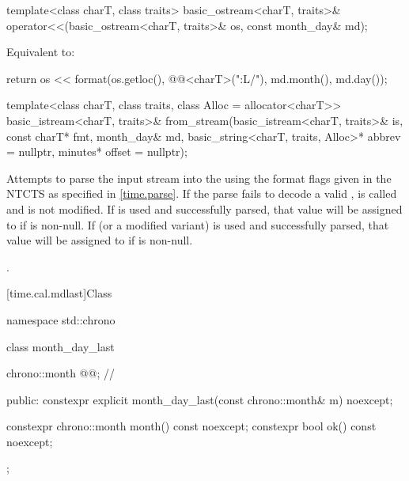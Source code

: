 %
\begin{itemdecl}
template<class charT, class traits>
  basic_ostream<charT, traits>&
    operator<<(basic_ostream<charT, traits>& os, const month_day& md);
\end{itemdecl}

\begin{itemdescr}
\pnum
\effects
Equivalent to:
\begin{codeblock}
return os << format(os.getloc(), @@<charT>("{:L}/{}"),
                    md.month(), md.day());
\end{codeblock}
\end{itemdescr}

%
\begin{itemdecl}
template<class charT, class traits, class Alloc = allocator<charT>>
  basic_istream<charT, traits>&
    from_stream(basic_istream<charT, traits>& is, const charT* fmt,
                month_day& md, basic_string<charT, traits, Alloc>* abbrev = nullptr,
                minutes* offset = nullptr);
\end{itemdecl}

\begin{itemdescr}
\pnum
\effects
Attempts to parse the input stream 
into the   using
the format flags given in the NTCTS 
as specified in \ref{time.parse}.
If the parse fails to decode a valid ,
 is called and
 is not modified.
If  is used and successfully parsed,
that value will be assigned to  if  is non-null.
If  (or a modified variant) is used and successfully parsed,
that value will be assigned to  if  is non-null.

\pnum
\returns
{}.
\end{itemdescr}

[time.cal.mdlast]{Class }

\begin{codeblock}
namespace std::chrono {
  class month_day_last {
    chrono::month @@;                   // \expos

  public:
    constexpr explicit month_day_last(const chrono::month& m) noexcept;

    constexpr chrono::month month() const noexcept;
    constexpr bool ok() const noexcept;
  };
}
\end{codeblock}

